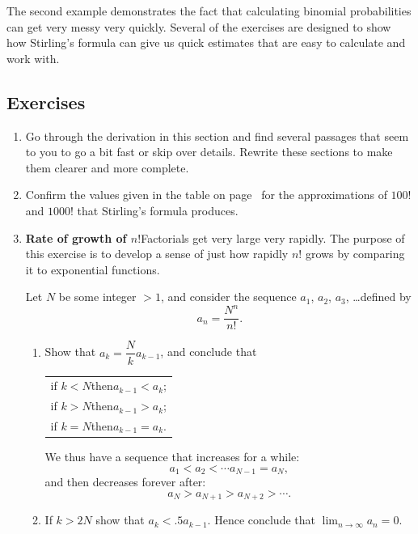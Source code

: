 The second example demonstrates the fact that calculating binomial
probabilities can get very messy very quickly.  Several of the
exercises are designed to show how Stirling's formula can give us
quick estimates that are easy to calculate and work with.

\subsection{Exercises}
\label{subsec:exercises}




\begin{enumerate}
\item Go through the derivation in this section and find several
passages that seem to you to go a bit fast or skip over details.
Rewrite these sections to make them clearer and more complete.


\item Confirm the values given in the table on page~\pageref{table2}
for the approximations of $100!$ and $1000!$ that Stirling's formula
produces.


\item {\bf Rate of growth of $n!$}\quad Factorials get very large very
rapidly.  The purpose of this exercise is to develop a sense of just
how rapidly $n!$ grows by comparing it to exponential functions.

Let $N$ be some integer $>1$, and consider the sequence $a_1$, $a_2$,
$a_3$, \ldots defined by
\[
a_n=\dfrac{N^n}{n!}.
\]


  \begin{enumerate}
  \item Show that $a_k = \dfrac{N}{k}a_{k-1}$, and conclude that
\begin{center}


\begin{tabular}{c}
if $k<N$\quad then\quad $a_{k-1}<a_k$; \\
if $k>N$\quad then\quad $a_{k-1}>a_k$; \\
if $k=N$\quad then\quad $a_{k-1}=a_k$. \\
\end{tabular}

\end{center}
We thus have a sequence that increases for a while: 
\[
a_1<a_2<\cdots a_{N-1}=a_N,
\] 
and then decreases forever after:
\[
a_N>a_{N+1}>a_{N+2}>\cdots .
\]


  \item If $k>2N$ show that $a_k<.5a_{k-1}$.  Hence conclude that
${\displaystyle \lim_{n\rightarrow\infty}a_n=0}$.


\end{enumerate}
\end{enumerate}
